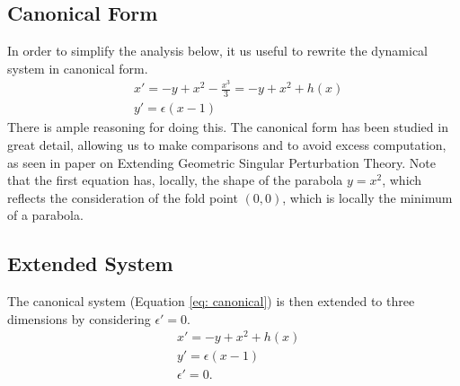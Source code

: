 \subsection{Canonical Form}
In order to simplify the analysis below, it us useful to rewrite the dynamical system in canonical form.
\begin{equation}
\begin{aligned}
&x'=-y+x^2-\frac{x^3}{3}=-y+x^2+h(x) \\
&y'=\epsilon(x-1)
\end{aligned}
\label{eq: canonical}
\end{equation}
There is ample reasoning for doing this. The canonical form has been studied in great detail, allowing us to make comparisons and to avoid excess computation, as seen in \citet{krupa2001} paper on Extending Geometric Singular Perturbation Theory.  Note that the first equation has, locally, the shape of the parabola $y= x^2$, which reflects the consideration of the fold point $(0,0)$, which is locally the minimum of a parabola.


\subsection{Extended System} \label{sec: extended sys blowup}
The canonical system (Equation \ref{eq: canonical}) is then extended to three dimensions by considering $\epsilon'=0$. 
\begin{equation} \label{extended FS}
\begin{aligned}
&x'=-y+x^2+h(x) \\
&y'=\epsilon(x-1)\\
&\epsilon'=0.
\end{aligned}
\end{equation}


